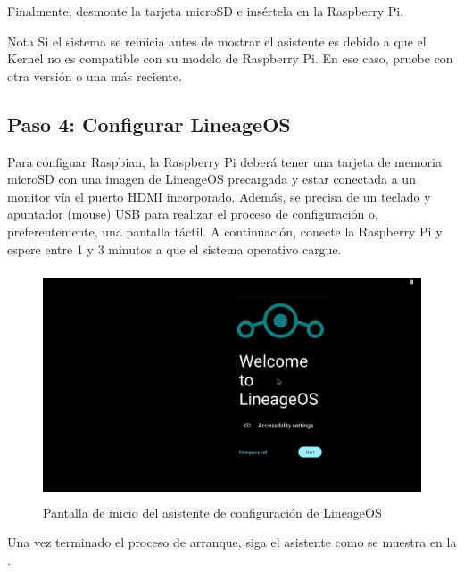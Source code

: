 \documentclass[letterpaper,10.5pt]{article}
\begin{document}
Finalmente, desmonte la tarjeta microSD e insértela en la Raspberry Pi.

\medskip{}

\begin{yellowbox}{Nota}
Si el sistema se reinicia antes de mostrar el asistente es debido a que el Kernel no es compatible con su modelo de Raspberry Pi. En ese caso, pruebe con otra versión o una más reciente.
\end{yellowbox}


%
%
\subsection{Paso 4: Configurar LineageOS}%
Para configuar Raspbian, la Raspberry Pi deberá tener una tarjeta de memoria microSD con una imagen de LineageOS precargada y estar conectada a un monitor vía el puerto HDMI incorporado.
Además, se precisa de un teclado y apuntador (mouse) USB para realizar el proceso de configuración o, preferentemente, una pantalla táctil.
A continuación, conecte la Raspberry Pi y espere entre 1 y 3 minutos a que el sistema operativo cargue.

\begin{figure}[H]
	\centering
	\includegraphics[width=0.9\linewidth,height=68mm,keepaspectratio]{img/p02-03-wizard-0.png} %
	\caption{Pantalla de inicio del asistente de configuración de LineageOS}
	\label{fig:lineageOS-wizard} %
\end{figure}

\noindent
Una vez terminado el proceso de arranque, siga el asistente como se muestra en la .
\end{document}
